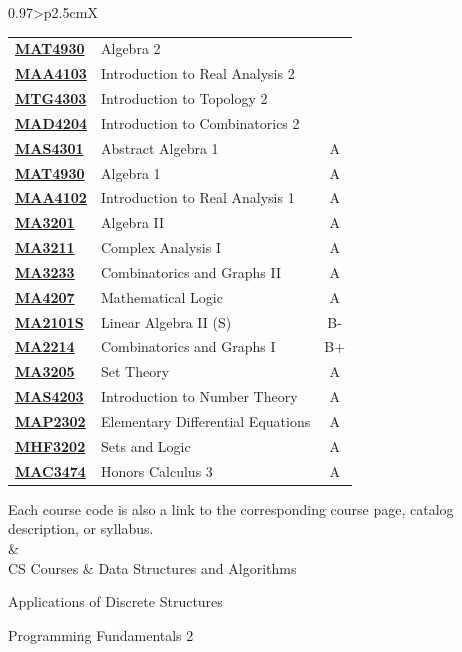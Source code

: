 \documentclass[12pt]{article}
\newcommand\alg{\color{violet}}
\newcommand\comb{\color{orange}}
\newcommand\anal{\color{green}}
\newcommand\calc{\color{teal}}
\newcommand\logic{\color{magenta}}
\newcommand\li{{\color{pink}\ding{117} }}
\begin{document}
\begin{tabularx}{0.97\linewidth}{>{\raggedleft\scshape}p{2.5cm}X}
\begin{tabular}{>{\bfseries}l|l|c}
	\alg \href{https://people.clas.ufl.edu/rcrew/mas-6332-spring-2024-algebra-1/}{MAT4930} & Algebra 2 & \\
	\anal \href{https://people.clas.ufl.edu/vatter/courses/4103s24/}{MAA4103} & Introduction to Real Analysis 2 & \\
	\anal \href{https://people.clas.ufl.edu/henry-adams/mtg4303-5317-s2024/}{MTG4303} & Introduction to Topology 2 & \\
	\comb \href{https://syllabus.math.ufl.edu/wp-content/uploads/sites/133/MAD4204-Hamaker-1.pdf}{MAD4204} & Introduction to Combinatorics 2 & \\\hline
	\alg \href{https://people.clas.ufl.edu/fgarvan/absalg-fall-2023/}{MAS4301} & Abstract Algebra 1 & A \\
	\alg \href{https://syllabus.math.ufl.edu/wp-content/uploads/sites/133/MAS6331-Crew.pdf}{MAT4930} & Algebra 1 & A \\
	\anal \href{https://people.clas.ufl.edu/vatter/past-courses/4102f23/}{MAA4102} & Introduction to Real Analysis 1 & A \\\hline
	\alg \href{https://nusmods.com/courses/MA3201/algebra-ii}{MA3201} & Algebra II & A \\
	\anal \href{https://nusmods.com/courses/MA3211/complex-analysis-i}{MA3211} & Complex Analysis I & A \\
	\comb \href{https://nusmods.com/courses/MA3233/combinatorics-and-graphs-ii}{MA3233} & Combinatorics and Graphs II & A \\
	\logic \href{https://www.comp.nus.edu.sg/~fstephan/mathlogicug.html}{MA4207} & Mathematical Logic & A \\\hline
	\alg \href{https://nusmods.com/courses/MA2101S/linear-algebra-ii-s}{MA2101S} & Linear Algebra II (S) & B- \\
	\comb \href{https://nusmods.com/courses/MA2214/combinatorics-and-graphs-i}{MA2214} & Combinatorics and Graphs I & B+ \\
	\logic \href{https://nusmods.com/courses/MA3205/set-theory}{MA3205} & Set Theory & A \\\hline
	\alg \href{https://people.clas.ufl.edu/alladik/mas-4203-spring-2022/}{MAS4203} & Introduction to Number Theory & A \\
	\calc \href{https://syllabus.math.ufl.edu/wp-content/uploads/sites/133/MAP2302-Demas-3.pdf}{MAP2302} & Elementary Differential Equations & A \\
	\logic \href{https://people.clas.ufl.edu/turull/s22-mhf3202/}{MHF3202} & Sets and Logic & A \\\hline
	\calc \href{https://people.clas.ufl.edu/shabanov/mac-3474-calculus-iii-honors-online-syllabus/}{MAC3474} & Honors Calculus 3 & A
\end{tabular}

Each course code is also a link to the corresponding course page, catalog description, or syllabus.
\\&\\
CS Courses & \li Data Structures and Algorithms

\li Applications of Discrete Structures

\li Programming Fundamentals 2
\end{tabularx}
\end{document}
